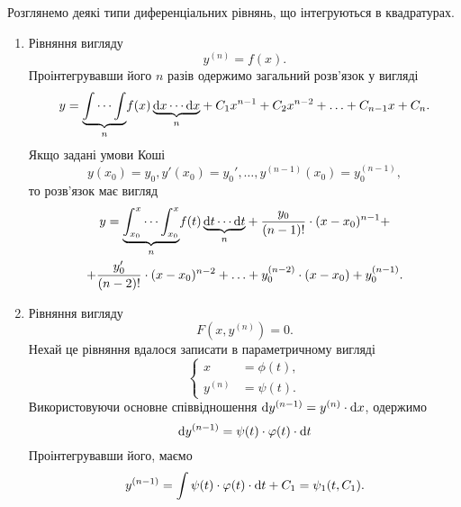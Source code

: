 Розглянемо деякі типи диференціальних рівнянь, що інтегруються в квадратурах.

\begin{enumerate}
\item Рівняння вигляду
\begin{equation*}
	y^{(n)} = f(x).
\end{equation*}
Проінтегрувавши його $n$ разів одержимо загальний розв’язок у вигляді
\begin{equation*}
	y = \underset{n}{\underbrace{\int \cdots \int}} f(x) \,\underset{n}{\underbrace{\mathop{}\!\mathrm{d} x \cdots \mathop{}\!\mathrm{d} x}} + C_1 x^{n-1} + C_2 x^{n-2} + \ldots + C_{n-1} x + C_n.
\end{equation*}
Якщо задані умови Коші
\begin{equation*}
	y(x_0) = y_0, y'(x_0) = y_0', \ldots, y^{(n - 1)} (x_0) = y_0^{(n-1)},
\end{equation*}
то розв’язок має вигляд
\begin{multline*}
	y = \underset{n}{\underbrace{\int_{x_0}^x \cdots \int_{x_0}^x}} f(t) \, \underset{n}{\underbrace{\mathop{}\!\mathrm{d} t \cdots \mathop{}\!\mathrm{d} t}} + \frac{y_0}{(n-1)!} \cdot (x-x_0)^{n-1} + \\ 
	+ \frac{y_0'}{(n-2)!} \cdot (x-x_0)^{n-2} + \ldots + y_0^{(n-2)} \cdot (x-x_0) + y_0^{(n-1)}.
\end{multline*}
\item Рівняння вигляду
\begin{equation*}
	F\left(x, y^{(n)}\right) = 0.
\end{equation*}
Нехай це рівняння вдалося записати в параметричному вигляді
\begin{equation*}
	\left\{
		\begin{aligned}
			x &= \phi(t), \\
			y^{(n)} &= \psi (t).
		\end{aligned}
	\right.
\end{equation*}
Використовуючи основне співвідношення $\mathop{}\!\mathrm{d} y^{(n-1)} = y^{(n)} \cdot \mathop{}\!\mathrm{d} x$, одержимо
\begin{equation*}
	\mathop{}\!\mathrm{d} y^{(n-1)} = \psi(t) \cdot \varphi(t) \cdot \mathop{}\!\mathrm{d} t
\end{equation*}
Проінтегрувавши його, маємо 
  \begin{equation*}
	y^{(n-1)} = \int \psi(t) \cdot \varphi(t) \cdot \mathop{}\!\mathrm{d} t + C_1 = \psi_1(t, C_1).
\end{equation*}

\end{enumerate}
